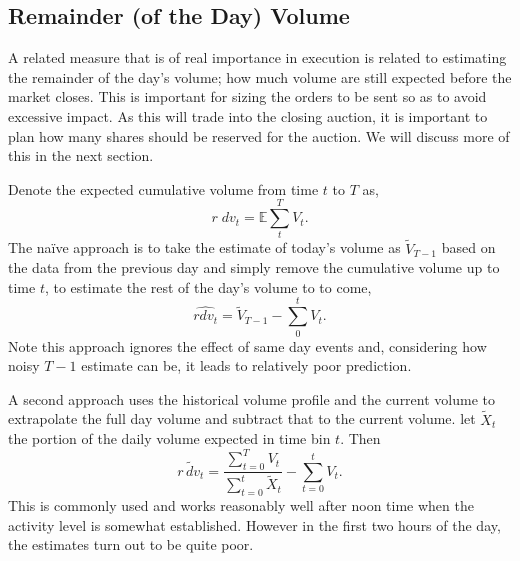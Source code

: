 \subsection{Remainder (of the Day) Volume}

A related measure that is of real importance in execution is related to estimating the remainder of the day's volume; how much volume are still expected before the market closes. This is important for sizing the orders to be sent so as to avoid excessive impact. As this will trade into the closing auction, it is important to plan how many shares should be reserved for the auction. We will discuss more of this in the next section.


Denote the expected cumulative volume from time $t$ to $T$ as,
	\begin{equation} \label{eq:rdv_1}
		r \;dv_t = \mathbb{E} \sum_t^T V_t.
	\end{equation}
The na\"ive approach is to take the estimate of today's volume as $\tilde{V}_{T-1}$  based on the data from the previous day and simply remove the cumulative volume up to time $t$, to estimate the rest of the day's volume to to come,
	\begin{equation}\label{eq:rdv_2}
		\widehat{rdv_t}=  \tilde{V}_{T-1} - \sum_0^t V_t.
	\end{equation}
Note this approach ignores the effect of same day events and, considering how noisy $T-1$ estimate can be, it leads to relatively poor prediction.


A second approach uses the historical volume profile and the current volume to extrapolate the full day volume and subtract that to the current volume. let $\tilde{X}_t$ the portion of the daily volume expected in time bin $t$. Then
	\begin{equation}\label{eq:rdv_3}
		\widetilde{r\,dv_t}= \dfrac{\sum_{t=0}^T V_t }{\sum_{t=0}^t \tilde{X}_t} - \sum_{t=0}^t V_t.
	\end{equation}
This is commonly used and works reasonably well after noon time when the activity level is somewhat established. However in the first two hours of the day, the estimates turn out to be quite poor.


